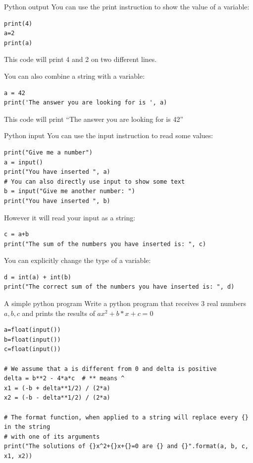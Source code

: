 \documentclass[aspectratio=169,]{beamer}
\begin{document}
\begin{frame}[fragile]{Python output}
    You can use the \alert{print} instruction to show the value of a variable:
    \begin{verbatim}
print(4)
a=2
print(a)
    \end{verbatim}
    This code will print 4 and 2 on two different lines.

    You can also combine a string with a variable:
    \begin{verbatim}
a = 42
print('The answer you are looking for is ', a)
    \end{verbatim}
    This code will print ``The answer you are looking for is 42''
\end{frame}

\begin{frame}[fragile]{Python input}
    You can use the \alert{input} instruction to read some values:
    \begin{verbatim}
print("Give me a number")
a = input()
print("You have inserted ", a)
# You can also directly use input to show some text
b = input("Give me another number: ")
print("You have inserted ", b)
    \end{verbatim}

    However it will read your input as a string:
    \begin{verbatim}
c = a+b
print("The sum of the numbers you have inserted is: ", c)
    \end{verbatim}

    You can explicitly change the type of a variable:
    \begin{verbatim}
d = int(a) + int(b)
print("The correct sum of the numbers you have inserted is: ", d)
    \end{verbatim}
\end{frame}

\begin{frame}[fragile]{A simple python program}
    Write a python program that receives 3 real numbers $a, b, c$ and prints the results of $ax^2 + b*x + c = 0$
    \pause
    \begin{verbatim}
a=float(input())
b=float(input())
c=float(input())

# We assume that a is different from 0 and delta is positive
delta = b**2 - 4*a*c  # ** means ^
x1 = (-b + delta**1/2) / (2*a)
x2 = (-b - delta**1/2) / (2*a)

# The format function, when applied to a string will replace every {} in the string
# with one of its arguments
print("The solutions of {}x^2+{}x+{}=0 are {} and {}".format(a, b, c, x1, x2))
    \end{verbatim}
\end{frame}
\end{document}
